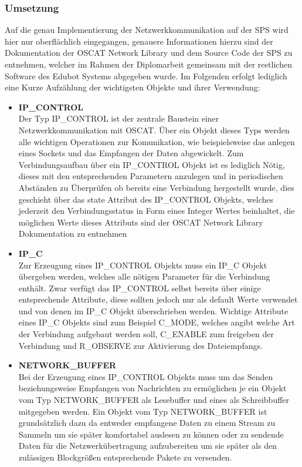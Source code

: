 \subsubsection{Umsetzung}
Auf die genau Implementierung der Netzwerkkommunikation auf der SPS wird hier nur oberflächlich eingegangen, genauere Informationen hierzu sind der Dokumentation der OSCAT Network Library und dem Source Code der SPS zu entnehmen, welcher im Rahmen der Diplomarbeit gemeinsam mit der restlichen Software des Edubot Systems abgegeben wurde. Im Folgenden erfolgt lediglich eine Kurze Aufzählung der wichtigsten Objekte und ihrer Verwendung:
\begin{itemize}
\item \textbf{IP\_CONTROL}\\
Der Typ IP\_CONTROL ist der zentrale Baustein einer Netzwerkkommunikation mit OSCAT. Über ein Objekt dieses Typs werden alle wichtigen Operationen zur Komunikation, wie beispielsweise das anlegen eines Sockets und das Empfangen der Daten abgewickelt. Zum Verbindungsaufbau über ein IP\_CONTROL Objekt ist es lediglich Nötig, dieses mit den entsprechenden Parametern anzulegen und in periodischen Abständen zu Überprüfen ob bereits eine Verbindung hergestellt wurde, dies geschieht über das state Attribut des IP\_CONTROL Objekts, welches jederzeit den Verbindungsstatus in Form eines Integer Wertes beinhaltet, die möglichen Werte dieses Attributs sind der OSCAT Network Library Dokumentation zu entnehmen

\item \textbf{IP\_C}\\
Zur Erzeugung eines IP\_CONTROL Objekts muss ein IP\_C Objekt übergeben werden, welches alle nötigen Parameter für die Verbindung enthält. Zwar verfügt das IP\_CONTROL selbst bereits über einige entsprechende Attribute, diese sollten jedoch nur als default Werte verwendet und von denen im IP\_C Objekt überschrieben werden. 
Wichtige Attribute eines IP\_C Objekts sind zum Beispiel C\_MODE, welches angibt welche Art der Verbindung aufgebaut werden soll, C\_ENABLE zum freigeben der Verbindung und R\_OBSERVE zur Aktivierung des Dateiempfangs.

\item \textbf{NETWORK\_BUFFER}\\
Bei der Erzeugung eines IP\_CONTROL Objekts muss um das Senden beziehungsweise Empfangen von Nachrichten zu ermöglichen je ein Objekt vom Typ NETWORK\_BUFFER als Lesebuffer und eines als Schreibbuffer mitgegeben werden. Ein Objekt vom Typ NETWORK\_BUFFER ist grundsätzlich dazu da entweder empfangene Daten zu einem Stream zu Sammeln um sie später komfortabel auslesen zu können oder zu sendende Daten für die Netzwerkübertragung aufzubereiten um sie später als den zulässigen Blockgrößen entsprechende Pakete zu versenden.
\end{itemize}

